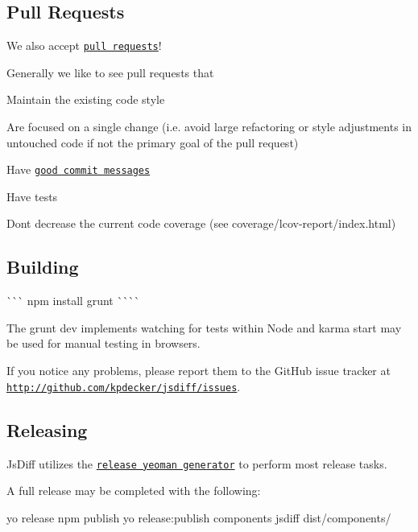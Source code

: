\subsection*{Pull Requests}

We also accept \href{https://github.com/kpdecker/jsdiff/pull/new/master}{\tt pull requests}!

Generally we like to see pull requests that
\begin{DoxyItemize}
\item Maintain the existing code style
\item Are focused on a single change (i.\+e. avoid large refactoring or style adjustments in untouched code if not the primary goal of the pull request)
\item Have \href{http://tbaggery.com/2008/04/19/a-note-about-git-commit-messages.html}{\tt good commit messages}
\item Have tests
\item Don\textquotesingle{}t decrease the current code coverage (see coverage/lcov-\/report/index.\+html)
\end{DoxyItemize}

\subsection*{Building}

\`{}\`{}\`{} npm install grunt \`{}\`{}\`{}\`{}

The {\ttfamily grunt dev} implements watching for tests within Node and {\ttfamily karma start} may be used for manual testing in browsers.

If you notice any problems, please report them to the Git\+Hub issue tracker at \href{http://github.com/kpdecker/jsdiff/issues}{\tt http\+://github.\+com/kpdecker/jsdiff/issues}.

\subsection*{Releasing}

Js\+Diff utilizes the \href{https://github.com/walmartlabs/generator-release}{\tt release yeoman generator} to perform most release tasks.

A full release may be completed with the following\+:


\begin{DoxyCode}
yo release
npm publish
yo release:publish components jsdiff dist/components/
\end{DoxyCode}
 